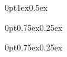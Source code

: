 \usepackage{titlesec}

\pagestyle{empty}

\titlespacing*{\section}
{0pt}{1ex}{0.5ex}

\titlespacing*{\subsection}
{0pt}{0.75ex}{0.25ex}

\titlespacing*{\subsubsection}
{0pt}{0.75ex}{0.25ex}

\setlength{\parskip}{0.5em}
\setlength{\parindent}{0pt}